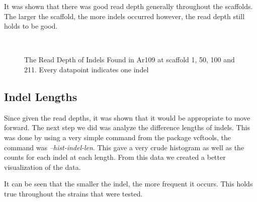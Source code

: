 \documentclass[12pt]{article}
\begin{document}
It was shown that there was good read depth generally throughout the scaffolds. The larger the scaffold, the more indels occurred however, the read depth still holds to be good. 

\begin{figure}[H]
	\begin{centering}
		\\
		\begin{singlespace}
			\vspace{-0.5cm}
			\caption[The Read Depth of Indels Found]{The Read Depth of Indels Found in Ar109 at scaffold 1, 50, 100 and 211. Every datapoint indicates one indel}\label{readdepth_indel}
		\end{singlespace}
	\end{centering}
\end{figure}

\subsection{Indel Lengths}  

Since given the read depths, it was shown that it would be appropriate to move forward. The next step we did was analyze the difference lengths of indels. This was done by using a very simple command from the package vcftools, the command was \textit{--hist-indel-len}. This gave a very crude histogram as well as the counts for each indel at each length. From this data we created a better visualization of the data. 

It can be seen that the smaller the indel, the more frequent it occurs. This holds true throughout the strains that were tested.
\end{document}
